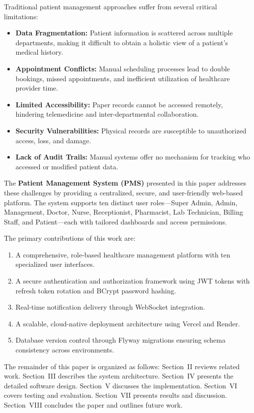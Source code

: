 \documentclass[conference]{IEEEtran}
\begin{document}
Traditional patient management approaches suffer from several critical limitations:
\begin{itemize}[leftmargin=*]
  \item \textbf{Data Fragmentation:} Patient information is scattered across multiple departments, making it difficult to obtain a holistic view of a patient's medical history.
  \item \textbf{Appointment Conflicts:} Manual scheduling processes lead to double bookings, missed appointments, and inefficient utilization of healthcare provider time.
  \item \textbf{Limited Accessibility:} Paper records cannot be accessed remotely, hindering telemedicine and inter-departmental collaboration.
  \item \textbf{Security Vulnerabilities:} Physical records are susceptible to unauthorized access, loss, and damage.
  \item \textbf{Lack of Audit Trails:} Manual systems offer no mechanism for tracking who accessed or modified patient data.
\end{itemize}

The \textbf{Patient Management System (PMS)} presented in this paper addresses these challenges by providing a centralized, secure, and user-friendly web-based platform. The system supports ten distinct user roles---Super Admin, Admin, Management, Doctor, Nurse, Receptionist, Pharmacist, Lab Technician, Billing Staff, and Patient---each with tailored dashboards and access permissions.

The primary contributions of this work are:
\begin{enumerate}[leftmargin=*]
  \item A comprehensive, role-based healthcare management platform with ten specialized user interfaces.
  \item A secure authentication and authorization framework using JWT tokens with refresh token rotation and BCrypt password hashing.
  \item Real-time notification delivery through WebSocket integration.
  \item A scalable, cloud-native deployment architecture using Vercel and Render.
  \item Database version control through Flyway migrations ensuring schema consistency across environments.
\end{enumerate}

The remainder of this paper is organized as follows: Section~II reviews related work. Section~III describes the system architecture. Section~IV presents the detailed software design. Section~V discusses the implementation. Section~VI covers testing and evaluation. Section~VII presents results and discussion. Section~VIII concludes the paper and outlines future work.
\end{document}
